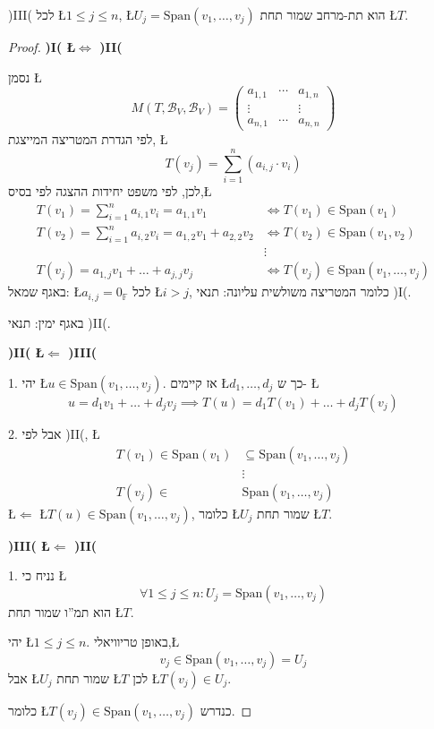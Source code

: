 \documentclass[english,hebrew]{article}
\begin{document}
)III( לכל \L{$1\leq j\leq n$}, \L{$U_{j}=\text{Span}(v_{1},\dots,v_{j})$}
הוא תת-מרחב שמור תחת \L{$T$}.
\begin{proof}
\textbf{)I( \L{$\iff$} )II(}

נסמן \L{%
\[
M(T,\mathcal{B}_{V},\mathcal{B}_{V})=\begin{pmatrix}a_{1,1} & \cdots & a_{1,n}\\
\vdots &  & \vdots\\
a_{n,1} & \cdots & a_{n,n}
\end{pmatrix}
\]
}%
לפי הגדרת המטריצה המייצגת, \L{%
\[
T(v_{j})=\sum_{i=1}^{n}\left(a_{i,j}\cdot v_{i}\right)
\]
}%
לכן, לפי משפט יחידות ההצגה לפי בסיס,\L{%
\begin{align*}
T(v_{1})=\sum_{i=1}^{n}a_{i,1}v_{i}=a_{1,1}v_{1} & \iff T(v_{1})\in\text{Span}(v_{1})\\
T(v_{2})=\sum_{i=1}^{n}a_{i,2}v_{i}=a_{1,2}v_{1}+a_{2,2}v_{2} & \iff T(v_{2})\in\text{Span}(v_{1},v_{2})\\
 & \vdots\\
T(v_{j})=a_{1,j}v_{1}+\dots+a_{j,j}v_{j} & \iff T(v_{j})\in\text{Span}(v_{1},\dots,v_{j})
\end{align*}
}%
באגף שמאל: \L{$a_{i,j}=0_{\mathbb{F}}$} לכל \L{$i>j$}, כלומר המטריצה
משולשית עליונה: תנאי )I(.

באגף ימין: תנאי )II(.

\textbf{)II( \L{$\Leftarrow$} )III(}

1. יהי \L{$u\in\text{Span}(v_{1},\dots,v_{j})$}. אז קיימים \L{$d_{1},\dots,d_{j}$}
כך ש- \L{%
\[
u=d_{1}v_{1}+\dots+d_{j}v_{j}\implies T(u)=d_{1}T(v_{1})+\dots+d_{j}T(v_{j})
\]
}%

2. אבל לפי )II(, \L{%
\begin{align*}
T(v_{1})\in\text{Span}(v_{1}) & \subseteq\text{Span}(v_{1},\dots,v_{j})\\
 & \vdots\\
T(v_{j})\in\  & \text{Span}(v_{1},\dots,v_{j})
\end{align*}
}%
\L{$\Leftarrow$} \L{$T(u)\in\text{Span}(v_{1},\dots,v_{j})$}, כלומר
\L{$U_{j}$} שמור תחת \L{$T$}.

\textbf{)III( \L{$\Leftarrow$} )II(}

1. נניח כי \L{%
\[
\forall1\le j\le n:U_{j}=\text{Span}(v_{1},\dots,v_{j})
\]
}%
 הוא תמ\textquotedblright ו שמור תחת \L{$T$}.

יהי \L{$1\le j\le n$}. באופן טריוויאלי,\L{%
\[
v_{j}\in\text{Span}\left(v_{1},\dots,v_{j}\right)=U_{j}
\]
}%
 אבל \L{$U_{j}$} שמור תחת \L{$T$} לכן \L{$T(v_{j})\in U_{j}$}.

כלומר \L{$T(v_{j})\in\text{Span}\left(v_{1},\dots,v_{j}\right)$}
כנדרש.
\end{proof}
\end{document}
